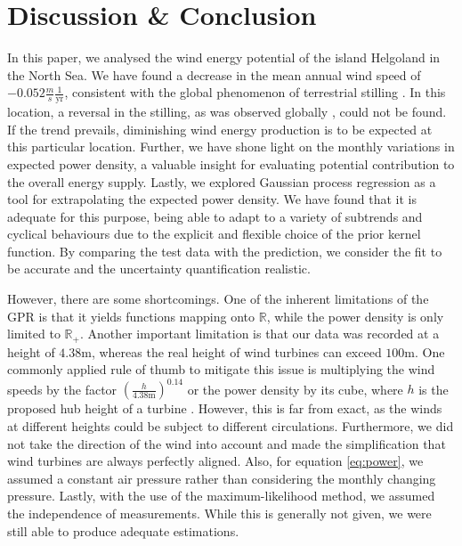 \documentclass{article}
\theoremstyle{plain}
\theoremstyle{definition}
\theoremstyle{remark}
\newcommand{\R}{\mathbb{R}}
\begin{document}
\section{Discussion \& Conclusion}\label{sec:conclusion}
In this paper, we analysed the wind energy potential of the island Helgoland in the North Sea. 
We have found a decrease in the mean annual wind speed of 
$-0.052 \frac{m}{s}  \frac{1}{\mathrm{yr}}$, 
consistent with the global phenomenon of terrestrial 
stilling \cite{stilling}. In this location, a reversal in the stilling, as  was observed globally \cite{stilling-reversal}, could not be found. If the trend prevails, diminishing wind energy production is to be expected at this particular location.
Further, we have shone light on the monthly variations in expected power density, a valuable insight for evaluating potential contribution to the overall energy supply.
Lastly, we explored Gaussian process regression as a tool for extrapolating the expected power density.
We have found that it is adequate for this purpose, 
being able to adapt to a variety of subtrends and cyclical behaviours due to the explicit and flexible choice of the prior kernel function. By comparing the test data with the prediction, we consider the fit to be accurate and the uncertainty quantification realistic.

However, there are some shortcomings. One of the inherent limitations of the GPR is that it yields functions mapping onto $\R$, while the power density is only limited to $\R_+$. 
Another important limitation is that our data was recorded at a height of $4.38 \mathrm{m}$, whereas the real height of wind turbines can exceed $100 \mathrm{m}$. One commonly applied rule of thumb to mitigate this issue
is multiplying the wind speeds by the factor 
$\left(\frac{h}{4.38 \mathrm{m}} \right)^{0.14}$ or the power density by its cube, 
where $h$ is the  proposed hub height of a turbine \citep{statanalysis}. However, this is far from exact, as the winds at different heights could be subject to different circulations. 
Furthermore, we did not take the direction of the wind into account and made the simplification that wind turbines are always perfectly aligned. 
Also, for equation \eqref{eq:power}, we assumed a constant air pressure rather than considering the monthly changing pressure.
Lastly, with the use of the maximum-likelihood method, we assumed the independence of measurements. While this is generally not given, we were still able to produce adequate estimations.
\end{document}
